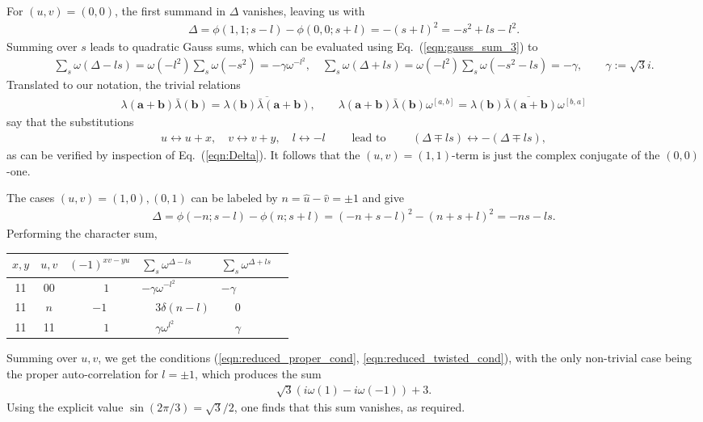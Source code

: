 \documentclass[aps,nofootinbib,floatfix,a4paper]{revtex4}
\newcommand{\1}{\mbox{$\mathbf{1}$}}
\renewcommand{\vec}{\mathbf}
\begin{document}
For $(u,v)=(0,0)$, the first summand in $\Delta$ vanishes, leaving us with
\begin{align*}
	\Delta
	=
	\phi(1,1;s-l) 
	-
	\phi(0,0;s+l)
	= 
	- (s+l)^2
	=
	-s^2+ls - l^2.
\end{align*}
Summing over $s$ leads to quadratic Gauss sums, which can be evaluated using Eq.~(\ref{eqn:gauss_sum_3}) to
\begin{align*}
	\sum_s \omega(\Delta-ls)
	=
	\omega(-l^2)
	\sum_s \omega(-s^2)
	=
	-
	\gamma
	\omega^{-l^2},
	\quad
	\sum_s \omega(\Delta+ls)
	=
	\omega(-l^2)
	\sum_s \omega(-s^2-ls)
	=
	-\gamma,
	\qquad
	\gamma:=\sqrt 3 i.
\end{align*}
Translated to our notation, the trivial relations
\begin{align*}
	\lambda(\vec a + \vec b) \bar \lambda(\vec b)
	=
	\overline{
		\lambda(\vec b)
		\bar\lambda(\vec a + \vec b) 
	},
	\qquad
	\lambda(\vec a + \vec b) \bar \lambda(\vec b)\omega^{[a,b]}
	=
	\overline{
		\lambda(\vec b)
		\bar\lambda(\vec a + \vec b) 
		\omega^{[b,a]}
	}
\end{align*}
say that the substitutions
\begin{align}\label{eqn:ab_symmetry}
	u \leftrightarrow u+x,
	\quad
	v \leftrightarrow v+y,
	\quad
	l \leftrightarrow -l
	\qquad\text{ lead to }\qquad
	(\Delta \mp ls) \leftrightarrow - (\Delta \mp ls),
\end{align}
as can be verified by inspection of Eq.~(\ref{eqn:Delta}).
It follows that the $(u,v)=(1,1)$-term is just the complex conjugate of the $(0,0)$-one.

The cases $(u,v)=(1,0), (0,1)$ can be labeled by $n=\hat u - \hat v=\pm 1$ and give
\begin{align*}
	\Delta
	=
	\phi(-n;s-l) 
	-
	\phi(n;s+l)
	=
	(-n+s-l)^2
	-
	(n+s+l)^2
	=
	-ns
	-ls 
	.
\end{align*}
Performing the character sum, 
\begin{center}
	\begin{tabular}{|c|c|c||l|l|l|}
		\hline
		$x,y$ & $u,v$ & $(-1)^{xv-yu}$ & $\sum_s \omega^{\Delta-ls}$ & $\sum_s\omega^{\Delta+ls}$ \\
		\hline
11&00  & $\phantom{-}1$	& $-\gamma\omega^{-l^2}$   & $-\gamma$   \\ 
11&$n$ & $-1$           & $\phantom{-}3\delta(n-l)$  	  & $\phantom{-}0$ \\ %
11&11  & $\phantom{-}1$	& $\phantom{-}\gamma\omega^{l^2}$   & $\phantom{-}\gamma$   \\ 
		\hline
	\end{tabular}
\end{center}
Summing over $u,v$, we get the conditions 
(\ref{eqn:reduced_proper_cond}, \ref{eqn:reduced_twisted_cond}),
with the only non-trivial case being the proper auto-correlation for $l=\pm 1$, which produces the sum
\begin{align*}
	\sqrt{3} (i \omega(1) - i \omega(-1))+3.
\end{align*}
Using the explicit value $\sin(2\pi/3)=\sqrt 3/2$, one finds that this sum vanishes, as required.
\end{document}
